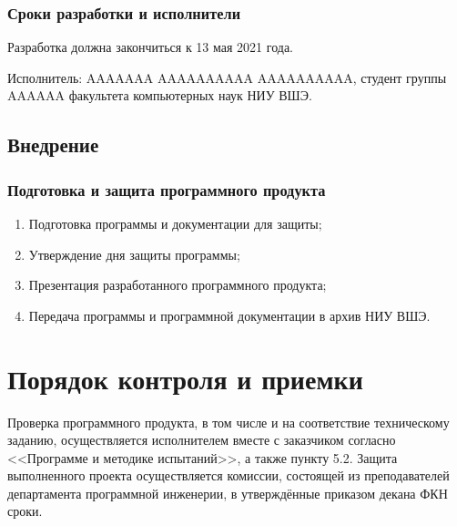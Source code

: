 \documentclass[a4paper,12pt,reqno]{article}
\begin{document}
      \subsubsection*{Сроки разработки и исполнители}
      Разработка должна закончиться к 13 мая 2021 года.

      Исполнитель: AAAAAAA AAAAAAAAAA AAAAAAAAAA, студент группы AAAAAA факультета компьютерных наук НИУ ВШЭ.
    \subsection{Внедрение}
      \subsubsection*{Подготовка и защита программного продукта}
      \begin{enumerate}
        \item Подготовка программы и документации для защиты;
        \item Утверждение дня защиты программы;
        \item Презентация разработанного программного продукта;
        \item Передача программы и программной документации в архив НИУ ВШЭ.
      \end{enumerate}




  \section{Порядок контроля и приемки}
  Проверка программного продукта, в том числе и на соответствие техническому заданию,
  осуществляется исполнителем вместе с заказчиком согласно <<Программе и методике испытаний>>, а также пункту 5.2.
  Защита выполненного проекта осуществляется комиссии, состоящей из преподавателей департамента программной инженерии,
  в утверждённые приказом декана ФКН сроки.

  \begin{CRTbibliography}
  \end{CRTbibliography}

  \CRTlistRegistration
\end{document}
